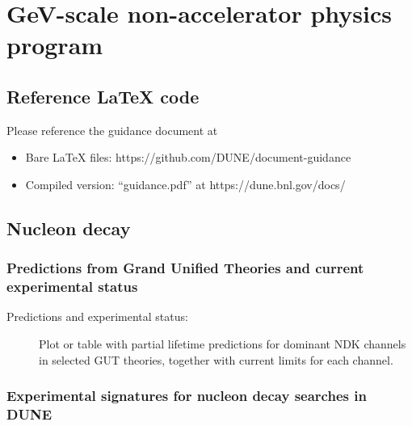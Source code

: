 \chapter{GeV-scale non-accelerator physics program}
\label{ch:nonaccel}


\section{Reference LaTeX code}

Please reference the guidance document at 

\begin{itemize}
\item Bare LaTeX files: https://github.com/DUNE/document-guidance
\item Compiled version: ``guidance.pdf'' at https://dune.bnl.gov/docs/
\end{itemize}


\section{Nucleon decay}
\label{sec:nonaccel-ndk}

\subsection{Predictions from Grand Unified Theories and current experimental status}
\label{subsec:nonaccel-ndk-status}

\begin{description}
\item[Predictions and experimental status:] Plot or table with partial lifetime predictions for dominant NDK channels in selected GUT theories, together with current limits for each channel.
\end{description}

\subsection{Experimental signatures for nucleon decay searches in DUNE}
\label{subsec:nonaccel-ndk-dune}

